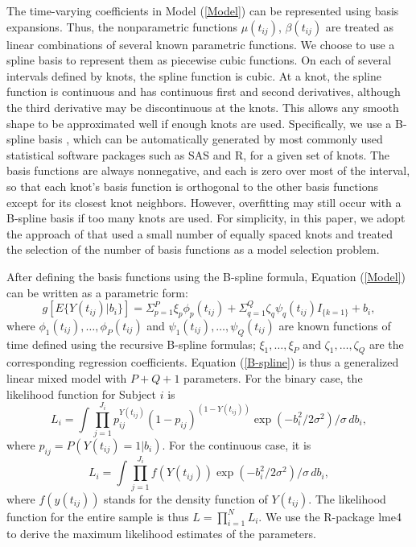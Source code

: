 The time-varying coefficients in Model (\ref{Model}) can be
represented using basis expansions. Thus, the nonparametric
functions $\mu(t_{ij})$, $\beta(t_{ij})$ are treated as linear
combinations of several known parametric functions. We choose to
use a spline basis to represent them as piecewise cubic functions.
On each of several intervals defined by knots, the spline function
is cubic. At a knot, the spline function is continuous and has
continuous first and second derivatives, although the third
derivative may be discontinuous at the knots. This allows any
smooth shape to be approximated well if enough knots are used.
Specifically, we use a B-spline basis \cite{deboor78}, which can
be automatically generated by most commonly used statistical
software packages such as SAS and R, for a given set of knots. The
basis functions are always nonnegative, and each is zero over most
of the interval, so that each knot's basis function is orthogonal
to the other basis functions except for its closest knot
neighbors. However, overfitting may still occur with a B-spline
basis if too many knots are used. For simplicity, in this paper,
we adopt the approach of \textbf{\cite{shiyko12}} that used a
small number of equally spaced knots and treated the selection of
the number of basis functions as a model selection problem.


After defining the basis functions using the B-spline formula,
Equation (\ref{Model}) can be written as a parametric form:
\begin{equation}\label{B-spline}
g[E\{Y(t_{ij})|b_{i}\}]=\Sigma_{p=1}^{P}\xi_{p}\phi_{p}(t_{ij})+\Sigma_{q=1}^{Q}\zeta_{q}\psi_{q}(t_{ij})I_{\{k=1\}}+b_i,
\end{equation}
where $\phi_{1}(t_{ij}),\ldots,\phi_{P}(t_{ij})$ and
$\psi_{1}(t_{ij}),\ldots,\psi_{Q}(t_{ij})$ are known functions of
time defined using the recursive B-spline formulas;
$\xi_1,\ldots,\xi_P$ and $\zeta_1,\ldots,\zeta_Q$ are the
corresponding regression coefficients. Equation (\ref{B-spline})
is thus a generalized linear mixed model with $P+Q+1$ parameters.
For the binary case, the likelihood function for Subject $i$ is
$$
L_{i}=\int\prod_{j=1}^{J_{i}}
p_{ij}^{Y(t_{ij})}(1-p_{ij})^{(1-Y(t_{ij}))}
\exp(-b_i^2/2\sigma^2)/\sigma\,d b_i,
$$
where $p_{ij}=P(Y(t_{ij})=1|b_i)$.
For the continuous case, it is
$$
L_{i}=\int\prod_{j=1}^{J_{i}}f(Y(t_{ij}))\exp(-b_i^2/2\sigma^2)/\sigma\,d
b_i,
$$
where $f(y(t_{ij}))$ stands for the density function of
$Y(t_{ij})$. The likelihood function for the entire sample is thus
$L=\prod_{i=1}^{N}L_{i}$. We use the R-package lme4 to derive the
maximum likelihood estimates of the parameters.

